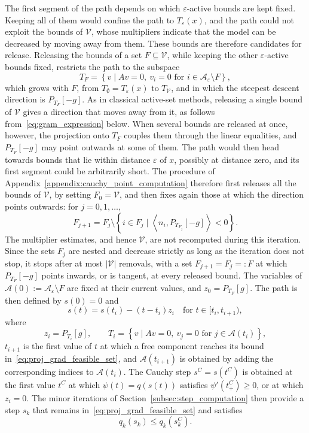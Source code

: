 \documentclass{article}
\numberwithin{equation}{section}
\newcommand{\calA}{{\mathcal{A}}}
\newcommand{\inner}[2]{\left\langle {#1} , {#2} \right\rangle} %
\newcommand{\proj}[2]{P_{#1} \left[ {#2} \right]} %
\theoremstyle{plain}
\begin{document}
The first segment of the path depends on which $\varepsilon$-active bounds are kept fixed. Keeping all of them would confine the path to $T_\varepsilon(x)$, and the path could not exploit the bounds of $\mathcal{V}$, whose multipliers indicate that the model can be decreased by moving away from them. These bounds are therefore candidates for release. Releasing the bounds of a set $F \subseteq \mathcal{V}$, while keeping the other $\varepsilon$-active bounds fixed, restricts the path to the subspace
\[T_F = \left\{v \mid Av = 0,\ v_i = 0 \text{ for } i \in \calA_\varepsilon\setminus F\right\},\]
which grows with $F$, from $T_\emptyset = T_\varepsilon(x)$ to $T_{\mathcal{V}}$, and in which the steepest descent direction is $\proj{T_F}{-g}$. As in classical active-set methods, releasing a single bound of $\mathcal{V}$ gives a direction that moves away from it, as follows from~\eqref{eq:gram_expression} below. When several bounds are released at once, however, the projection onto $T_F$ couples them through the linear equalities, and $\proj{T_F}{-g}$ may point outwards at some of them. The path would then head towards bounds that lie within distance $\varepsilon$ of $x$, possibly at distance zero, and its first segment could be arbitrarily short. The procedure of Appendix~\ref{appendix:cauchy_point_computation} therefore first releases all the bounds of $\mathcal{V}$, by setting $F_0 = \mathcal{V}$, and then fixes again those at which the direction points outwards: for $j = 0,1,\ldots$,
\begin{equation}\label{eq:refixing}
	F_{j+1} = F_j \setminus \left\{ i \in F_j \mid \inner{n_i}{\proj{T_{F_j}}{-g}} < 0 \right\}.
\end{equation}
The multiplier estimates, and hence $\mathcal{V}$, are not recomputed during this iteration. Since the sets $F_j$ are nested and decrease strictly as long as the iteration does not stop, it stops after at most $|\mathcal{V}|$ removals, with a set $F_{j+1} = F_j =: F$ at which $\proj{T_F}{-g}$ points inwards, or is tangent, at every released bound. The variables of $\calA(0) := \calA_\varepsilon \setminus F$ are fixed at their current values, and $z_0 = \proj{T_F}{g}$. The path is then defined by $s(0) = 0$ and
\[s(t) = s(t_i) - (t-t_i)z_i \quad \text{for } t \in [t_i,t_{i+1}),\]
where
\begin{equation}\label{eq:reduced_gradient_proj_grad_path}
	z_i = \proj{T_i}{g}, \qquad T_i = \left\{v \mid Av = 0,\ v_j = 0 \text{ for } j \in \calA(t_i)\right\},
\end{equation}
$t_{i+1}$ is the first value of $t$ at which a free component reaches its bound in~\eqref{eq:proj_grad_feasible_set}, and $\calA(t_{i+1})$ is obtained by adding the corresponding indices to $\calA(t_i)$. The Cauchy step $s^C = s(t^C)$ is obtained at the first value $t^C$ at which $\psi(t) = q(s(t))$ satisfies $\psi'(t^C_+) \ge 0$, or at which $z_i = 0$. The minor iterations of Section~\ref{subsec:step_computation} then provide a step $s_k$ that remains in~\eqref{eq:proj_grad_feasible_set} and satisfies
\begin{equation}\label{eq:step_drecrease_wrt_cauchy}
	q_k(s_k) \le q_k(s_k^C).
\end{equation}
\end{document}
